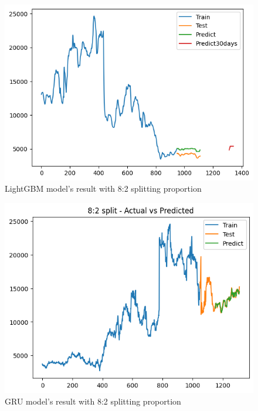 \documentclass{ieeeojies}
\begin{document}
\vspace{-1em}

\begin{figure}[H]
  \centering
  \begin{minipage}{0.8\linewidth}
    \centering
    \includegraphics[width=\linewidth]{bibliography/Figure/LightGBM_AMV(8_2).png}
    \caption{LightGBM model's result with 8:2 splitting proportion}
    \label{fig8}
  \end{minipage}
\end{figure}

\vspace{-1em}

\begin{figure}[H]
  \centering
  \begin{minipage}{0.8\linewidth}
    \centering
    \includegraphics[width=\linewidth]{bibliography/Figure/AMV_GRU.png}
    \caption{GRU model's result with 8:2 splitting proportion}
    \label{fig8}
  \end{minipage}
\end{figure}
\end{document}
